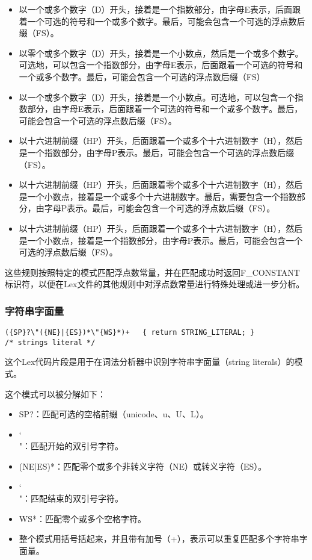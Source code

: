 \documentclass[lang=cn,11pt,a4paper]{elegantpaper}
\begin{document}
\begin{itemize}
    \item 以一个或多个数字（D）开头，接着是一个指数部分，由字母E表示，后面跟着一个可选的符号和一个或多个数字。最后，可能会包含一个可选的浮点数后缀（FS）。
    \item 以零个或多个数字（D）开头，接着是一个小数点，然后是一个或多个数字。可选地，可以包含一个指数部分，由字母E表示，后面跟着一个可选的符号和一个或多个数字。最后，可能会包含一个可选的浮点数后缀（FS）
    \item 以一个或多个数字（D）开头，接着是一个小数点。可选地，可以包含一个指数部分，由字母E表示，后面跟着一个可选的符号和一个或多个数字。最后，可能会包含一个可选的浮点数后缀（FS）。
    \item 以十六进制前缀（HP）开头，后面跟着一个或多个十六进制数字（H），然后是一个指数部分，由字母P表示。最后，可能会包含一个可选的浮点数后缀（FS）。
    \item 以十六进制前缀（HP）开头，后面跟着零个或多个十六进制数字（H），然后是一个小数点，接着是一个或多个十六进制数字。最后，需要包含一个指数部分，由字母P表示。最后，可能会包含一个可选的浮点数后缀（FS）。
    \item 以十六进制前缀（HP）开头，后面跟着一个或多个十六进制数字（H），然后是一个小数点，接着是一个指数部分，由字母P表示。最后，可能会包含一个可选的浮点数后缀（FS）。
\end{itemize}

这些规则按照特定的模式匹配浮点数常量，并在匹配成功时返回F\_CONSTANT标识符，以便在Lex文件的其他规则中对浮点数常量进行特殊处理或进一步分析。

\subsubsection{字符串字面量}

\begin{lstlisting}
({SP}?\"({NE}|{ES})*\"{WS}*)+	{ return STRING_LITERAL; }    
/* strings literal */
\end{lstlisting}

这个Lex代码片段是用于在词法分析器中识别字符串字面量（string literals）的模式。

这个模式可以被分解如下：
\begin{itemize}
    \item {SP}?：匹配可选的空格前缀（unicode、u、U、L）。
    \item \char`\\"：匹配开始的双引号字符。
    \item ({NE}|{ES})*：匹配零个或多个非转义字符（{NE}）或转义字符（{ES}）。
    \item \char`\\"：匹配结束的双引号字符。
    \item {WS}*：匹配零个或多个空格字符。
    \item 整个模式用括号括起来，并且带有加号（+），表示可以重复匹配多个字符串字面量。
\end{itemize}
\end{document}
